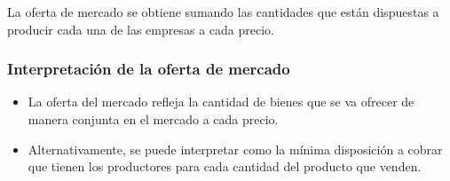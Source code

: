 \documentclass{beamer}
\begin{document}
\begin{frame}
\begin{center}
\end{center}
\centering
La oferta de mercado se obtiene sumando las cantidades que están dispuestas a producir cada una de las empresas a cada precio.
\end{frame}

\begin{frame}
    \frametitle{Interpretación de la oferta de mercado}
\begin{itemize}
    \item  La oferta del mercado refleja la cantidad de bienes que se va ofrecer de manera conjunta en el mercado a cada precio.
    \item Alternativamente, se puede interpretar como la mínima disposición a cobrar que tienen los productores para cada cantidad del producto que venden.
\end{itemize}

    \begin{center}
    \end{center}
\end{frame}
\end{document}
